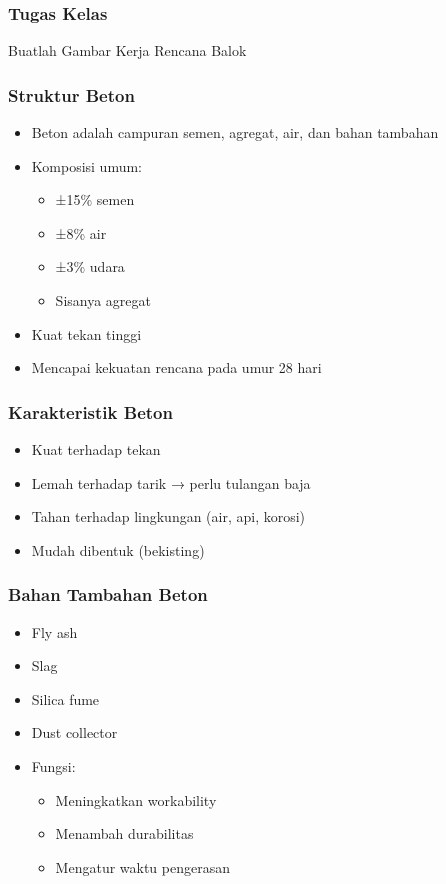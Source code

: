 \documentclass[../main.tex]{subfiles}
\begin{document}
\begin{frame}[mytitle=standard,c,mycolor=digiPH_white,light]
	\frametitle{Tugas Kelas}

	\normalsize	Buatlah Gambar Kerja \huge Rencana Balok \normalsize

\end{frame}


\begin{frame}[mytitle=standard,t,mycolor=digiPH_uniblue,light]\frametitle{Struktur Beton}
	\begin{itemize}
		\item Beton adalah campuran semen, agregat, air, dan bahan tambahan
		\item Komposisi umum:
		      \begin{itemize}
			      \item ±15\% semen
			      \item ±8\% air
			      \item ±3\% udara
			      \item Sisanya agregat
		      \end{itemize}
		\item Kuat tekan tinggi
		\item Mencapai kekuatan rencana pada umur 28 hari
	\end{itemize}
\end{frame}

\begin{frame}[mytitle=standard,t,mybg=bglight2,light]\frametitle{Karakteristik Beton}
	\begin{itemize}
		\item Kuat terhadap tekan
		\item Lemah terhadap tarik → perlu tulangan baja
		\item Tahan terhadap lingkungan (air, api, korosi)
		\item Mudah dibentuk (bekisting)
	\end{itemize}\end{frame}

\begin{frame}[mytitle=standard,t,mybg=bglight3,light]\frametitle{Bahan Tambahan Beton}
	\begin{itemize}
		\item Fly ash
		\item Slag
		\item Silica fume
		\item Dust collector
		\item Fungsi:
		      \begin{itemize}
			      \item Meningkatkan workability
			      \item Menambah durabilitas
			      \item Mengatur waktu pengerasan
		      \end{itemize}
	\end{itemize}\end{frame}
\end{document}

